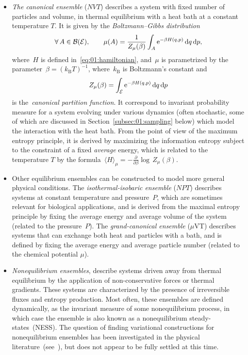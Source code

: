 \begin{itemize}
    \item{\textit{The canonical ensemble} ($NVT$) describes a system with fixed number of particles and volume, in thermal equilibrium with a heat bath at a constant temperature $T$. It is given by the \textit{Boltzmann--Gibbs distribution}
    \begin{equation}
        \label{eq:01:boltzmann_gibbs}
        \forall\,A\in\mathcal B(\mathcal{E}),\qquad \mu(A) = \frac{1}{Z_\mu(\beta)}\int_{A}\mathrm{e}^{-\beta H(q,p)}\,\mathrm{d} q\,\mathrm{d} p,
    \end{equation}
    where~$H$ is defined in~\eqref{eq:01:hamiltonian}, and~$\mu$ is parametrized by the parameter~$\beta = (k_{\mathrm{B}}T)^{-1}$, where~$k_{\mathrm{B}}$ is Boltzmann's constant and
    \[
    Z_\mu(\beta) = \int_{\mathcal{E}}\mathrm{e}^{-\beta H(q,p)}\,\mathrm{d} q\,\mathrm{d} p
    \]
    is the~\textit{canonical partition function}.
    It correspond to invariant probability measure for a system evolving under various dynamics (often stochastic, some of which are discussed in Section~\ref{subsec:01:sampling} below) which model the interaction with the heat bath. From the point of view of the maximum entropy principle, it is derived by maximizing the information entropy subject to the constraint of a fixed \textit{average} energy, which is related to the temperature $T$ by the formula~${\langle H\rangle_{\mu} = -\frac{\partial}{\partial\beta}\log\,Z_\mu(\beta)}$. }
    \item{Other equilibrium ensembles can be constructed to model more general physical conditions. The \textit{isothermal-isobaric ensemble} ($NPT$) describes systems at constant temperature and pressure~$P$, which are sometimes relevant for biological applications, and is derived from the maximal entropy principle by fixing the average energy and average volume of the system (related to the pressure~$P$). The \textit{grand-canonical ensemble} ($\mu$VT) describes systems that can exchange both heat and particles with a bath, and is defined by fixing the average energy and average particle number (related to the chemical potential $\mu$).}
    \item{\textit{Nonequilibrium ensembles}, describe systems driven away from thermal equilibrium by the application of non-conservative forces or thermal gradients. These systems are characterized by the presence of irreversible fluxes and entropy production. Most often, these ensembles are defined dynamically, as the invariant measure of some nonequilibrium process, in which case the ensemble is also known as a nonequilibrium steady-states~(NESS). The question of finding variational constructions for nonequilibrium ensembles has been investigated in the physical literature~(see~\cite{J80}), but does not appear to be fully settled at this time.}
\end{itemize}
